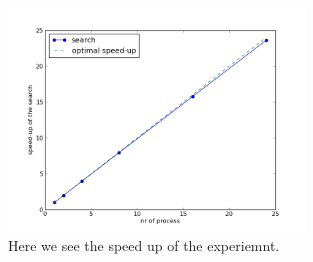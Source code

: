\documentclass[a4paper,10pt]{article}
\begin{document}
\begin{figure}[htb]
  \centering
  \includegraphics[width=0.7\textwidth]{graphics/openmp17gb/search_speedup.png}
  \caption{Here we see the speed up of the experiemnt.}
  \label{fig:openmp_speedup}
\end{figure}
\end{document}
